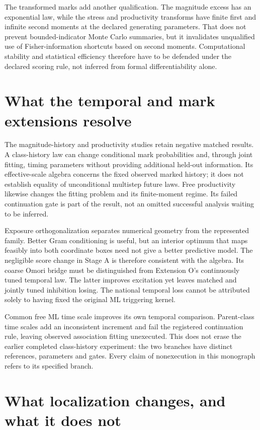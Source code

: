 The transformed marks add another qualification. The magnitude excess has an exponential law, while the stress and productivity transforms have finite first and infinite second moments at the declared generating parameters. That does not prevent bounded-indicator Monte Carlo summaries, but it invalidates unqualified use of Fisher-information shortcuts based on second moments. Computational stability and statistical efficiency therefore have to be defended under the declared scoring rule, not inferred from formal differentiability alone.


\section{What the temporal and mark extensions resolve}

The magnitude-history and productivity studies retain negative matched results. A class-history law can change conditional mark probabilities and, through joint fitting, timing parameters without providing additional held-out information. Its effective-scale algebra concerns the fixed observed marked history; it does not establish equality of unconditional multistep future laws. Free productivity likewise changes the fitting problem and its finite-moment regime. Its failed continuation gate is part of the result, not an omitted successful analysis waiting to be inferred.

Exposure orthogonalization separates numerical geometry from the represented family. Better Gram conditioning is useful, but an interior optimum that maps feasibly into both coordinate boxes need not give a better predictive model. The negligible score change in Stage A is therefore consistent with the algebra. Its coarse Omori bridge must be distinguished from Extension O's continuously tuned temporal law. The latter improves excitation yet leaves matched and jointly tuned inhibition losing. The national temporal loss cannot be attributed solely to having fixed the original ML triggering kernel.

Common free ML time scale improves its own temporal comparison. Parent-class time scales add an inconsistent increment and fail the registered continuation rule, leaving observed association fitting unexecuted. This does not erase the earlier completed class-history experiment: the two branches have distinct references, parameters and gates. Every claim of nonexecution in this monograph refers to its specified branch.

\section{What localization changes, and what it does not}

